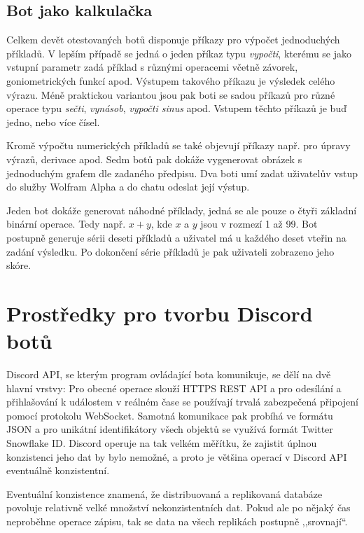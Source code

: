 \documentclass[FM]{tulthesis}
\begin{document}
	\section{Bot jako kalkulačka}
	
	Celkem devět otestovaných botů disponuje příkazy pro výpočet jednoduchých příkladů. V lepším případě se jedná o jeden příkaz typu \textit{vypočti}, kterému se jako vstupní parametr zadá příklad s různými operacemi včetně závorek, goniometrických funkcí apod. Výstupem takového příkazu je výsledek celého výrazu. Méně praktickou variantou jsou pak boti se sadou příkazů pro různé operace typu \textit{sečti}, \textit{vynásob}, \textit{vypočti sinus} apod. Vstupem těchto příkazů je buď jedno, nebo více čísel.
	
	Kromě výpočtu numerických příkladů se také objevují příkazy např. pro úpravy výrazů, derivace apod. Sedm botů pak dokáže vygenerovat obrázek s jednoduchým grafem dle zadaného předpisu. Dva boti umí zadat uživatelův vstup do služby Wolfram Alpha a do chatu odeslat její výstup.
	
	Jeden bot dokáže generovat náhodné příklady, jedná se ale pouze o čtyři základní binární operace. Tedy např. $x+y$, kde $x$ a $y$ jsou v rozmezí 1 až 99. Bot postupně generuje sérii deseti příkladů a uživatel má u každého deset vteřin na zadání výsledku. Po dokončení série příkladů je pak uživateli zobrazeno jeho skóre.
	
	
	\chapter{Prostředky pro tvorbu Discord botů}\label{Chapter4}
		
	Discord API, se kterým program ovládající bota komunikuje, se dělí na dvě hlavní vrstvy: Pro obecné operace slouží HTTPS REST API a pro odesílání a přihlašování k událostem v reálném čase se používají trvalá zabezpečená připojení pomocí protokolu WebSocket. Samotná komunikace pak probíhá ve formátu JSON a pro unikátní identifikátory všech objektů se využívá formát Twitter Snowflake ID. \mbox{Discord} operuje na tak velkém měřítku, že zajistit úplnou konzistenci jeho dat by bylo nemožné, a proto je většina operací v Discord API eventuálně konzistentní. \cite{doc_Discord}
	
	Eventuální konzistence znamená, že distribuovaná a replikovaná databáze povoluje relativně velké množství nekonzistentních dat. Pokud ale po nějaký čas neproběhne operace zápisu, tak se data na všech replikách postupně ,,srovnají``. \cite{book_distributedSystems4}
	
\end{document}
